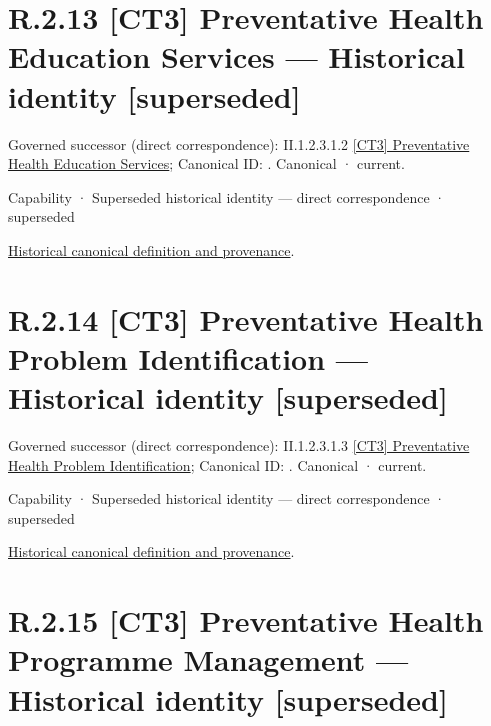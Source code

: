 \section*{R.2.13 [CT3] Preventative Health Education Services — Historical identity [superseded]}
\label{navigation:R.2.13}

{\small Governed successor (direct correspondence): II.1.2.3.1.2 \hyperref[element:7541d9b3b65d47d286dabdc093cb0eed]{[CT3] Preventative Health Education Services}; Canonical ID: \texttt{}. Canonical · current.}\par
\label{element:dbe10959237f405caeadef2a5748303a}
{\small Capability · Superseded historical identity — direct correspondence · superseded}\par
\href{../../../../continuum/strategy/capability/dbe10959237f405caeadef2a5748303a.md}{Historical canonical definition and provenance}.\par
\section*{R.2.14 [CT3] Preventative Health Problem Identification — Historical identity [superseded]}
\label{navigation:R.2.14}

{\small Governed successor (direct correspondence): II.1.2.3.1.3 \hyperref[element:c1567022671f433fa1eeb37a9d156d92]{[CT3] Preventative Health Problem Identification}; Canonical ID: \texttt{}. Canonical · current.}\par
\label{element:b35d3521141c419fb676a79b2ede40bd}
{\small Capability · Superseded historical identity — direct correspondence · superseded}\par
\href{../../../../continuum/strategy/capability/b35d3521141c419fb676a79b2ede40bd.md}{Historical canonical definition and provenance}.\par
\section*{R.2.15 [CT3] Preventative Health Programme Management — Historical identity [superseded]}
\label{navigation:R.2.15}

